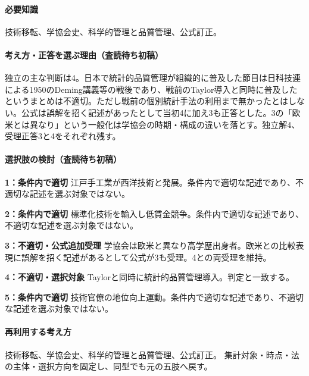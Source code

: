 \paragraph{必要知識} 技術移転、学協会史、科学的管理と品質管理、公式訂正。

\paragraph{考え方・正答を選ぶ理由（査読待ち初稿）} 独立の主な判断は4。日本で統計的品質管理が組織的に普及した節目は日科技連による1950のDeming講義等の戦後であり、戦前のTaylor導入と同時に普及したというまとめは不適切。ただし戦前の個別統計手法の利用まで無かったとはしない。公式は誤解を招く記述があったとして当初4に加え3も正答とした。3の「欧米とは異なり」という一般化は学協会の時期・構成の違いを落とす。独立解4、受理正答3と4をそれぞれ残す。

\paragraph{選択肢の検討（査読待ち初稿）}\mbox{}\par

\noindent\textbf{1：条件内で適切} 江戸手工業が西洋技術と発展。条件内で適切な記述であり、不適切な記述を選ぶ対象ではない。\par

\noindent\textbf{2：条件内で適切} 標準化技術を輸入し低賃金競争。条件内で適切な記述であり、不適切な記述を選ぶ対象ではない。\par

\noindent\textbf{3：不適切・公式追加受理} 学協会は欧米と異なり高学歴出身者。欧米との比較表現に誤解を招く記述があるとして公式が3も受理。4との両受理を維持。\par

\noindent\textbf{4：不適切・選択対象} Taylorと同時に統計的品質管理導入。判定と一致する。\par

\noindent\textbf{5：条件内で適切} 技術官僚の地位向上運動。条件内で適切な記述であり、不適切な記述を選ぶ対象ではない。\par

\paragraph{再利用する考え方} 技術移転、学協会史、科学的管理と品質管理、公式訂正。 集計対象・時点・法の主体・選択方向を固定し、同型でも元の五肢へ戻す。

